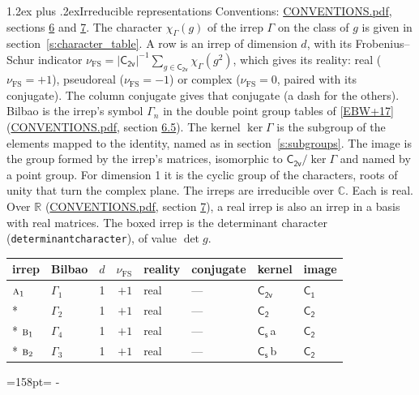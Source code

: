 \documentclass[10pt,a4paper]{article}
\makeatletter
\renewcommand\section{\@startsection{section}{1}{\z@}{-3ex plus -1ex minus -.2ex}%
  {1.2ex plus .2ex}{\normalfont\large\sffamily\bfseries\color{parttitle}}}
\newcommand{\needspace}[1]{\par\penalty-100\begingroup\dimen0=#1\relax\dimen2=\pagegoal
  \advance\dimen2-\pagetotal\ifdim\dimen0>\dimen2\relax\ifdim\dimen2>0pt\vfil\break\fi\fi
  \endgroup}
\numberwithin{equation}{section}
\newcommand{\grp}[1]{\mathsf{#1}}
\newcommand{\irr}[1]{\text{\normalfont\scshape #1}}
\newcommand{\detbox}[1]{{\setlength{\fboxsep}{1pt}\fbox{#1}}}
\newcommand{\clsletter}[1]{\,{\scriptsize\color{black!55}#1}}
\newcommand{\irchar}[1]{\chi_{#1}}
\newcommand{\fsind}{\nu_{\mathrm{FS}}}
\makeatother
\begin{document}
\section{Irreducible representations}\label{s:irreps}
Conventions: \href{../../CONVENTIONS.pdf}{CONVENTIONS.pdf}, sections \href{../../CONVENTIONS.pdf\#conv.6}{6} and \href{../../CONVENTIONS.pdf\#conv.7}{7}.
\leavevmode\label{n:function.character}\label{n:irrep.Gamma}The character $\irchar{\Gamma}(g)$ of the irrep $\Gamma$ on the class of $g$ is given in section~\ref{s:character_table}.
\leavevmode\label{n:index.dimension}\label{n:index.frobenius}\label{n:head.irrep}\label{n:head.reality}A row is an irrep of dimension $d$, with its Frobenius--Schur indicator $\fsind = |\grp{C_{2v}}|^{-1}\allowbreak\sum_{g\in\grp{C_{2v}}}\irchar{\Gamma}(g^2)$, which gives its reality: real ($\fsind = +1$), pseudoreal ($\fsind = -1$) or complex ($\fsind = 0$, paired with its conjugate). \label{n:head.conjugate}The column conjugate gives that conjugate (a dash for the others). \label{n:head.bilbao}\label{n:irrep.alias.gamma}Bilbao is the irrep's symbol $\Gamma_n$ in the double point group tables of [\href{../../../REFERENCES.pdf\#ref.EBW+17}{EBW+17}] (\href{../../CONVENTIONS.pdf}{CONVENTIONS.pdf}, section \href{../../CONVENTIONS.pdf\#conv.6.5}{6.5}). \label{n:head.kernel}The kernel $\ker\Gamma$ is the subgroup of the elements mapped to the identity, named as in section~\ref{s:subgroups}. \label{n:head.image}The image is the group formed by the irrep's matrices, isomorphic to $\grp{C_{2v}}/\ker\Gamma$ and named by a point group. For dimension 1 it is the cyclic group of the characters, roots of unity that turn the complex plane. The irreps are irreducible over $\mathbb{C}$. Each is real. Over $\mathbb{R}$ (\href{../../CONVENTIONS.pdf}{CONVENTIONS.pdf}, section \href{../../CONVENTIONS.pdf\#conv.7}{7}), a real irrep is also an irrep in a basis with real matrices. \label{n:mark.determinant}The boxed irrep is the determinant character (\texttt{determinantcharacter}), of value $\det g$.
\setlength{\emergencystretch}{2em}\par\setlength{\emergencystretch}{0pt}
{\small\renewcommand{\arraystretch}{1.25}\begin{longtable}{@{}llrrllll@{}}\toprule
irrep & Bilbao & $d$ & $\fsind$ & reality & conjugate & kernel & image\\\midrule\endhead
\bottomrule\endfoot\endlastfoot
$\irr{a}_{1}$ & $\Gamma_{1}$ & 1 & $+1$ & real & --- & \href{C2v.pdf}{$\grp{C_{2v}}$} & \href{C1.pdf}{$\grp{C_{1}}$}\\*
\detbox{$\irr{a}_{2}$} & $\Gamma_{2}$ & 1 & $+1$ & real & --- & \href{C2.pdf}{$\grp{C_{2}}$} & \href{C2.pdf}{$\grp{C_{2}}$}\\*
$\irr{b}_{1}$ & $\Gamma_{4}$ & 1 & $+1$ & real & --- & \href{C1v.pdf}{$\grp{C_{s}}$}\clsletter{a} & \href{C2.pdf}{$\grp{C_{2}}$}\\*
$\irr{b}_{2}$ & $\Gamma_{3}$ & 1 & $+1$ & real & --- & \href{C1v.pdf}{$\grp{C_{s}}$}\clsletter{b} & \href{C2.pdf}{$\grp{C_{2}}$}\\
\bottomrule\end{longtable}}
\needspace{158pt}
\end{document}

